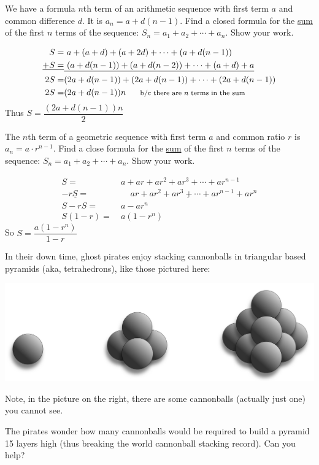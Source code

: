 \documentclass[10pt]{exam}
\begin{document}
\begin{questions}
\question[4] We have a formula $n$th term of an arithmetic sequence with first term $a$ and common difference $d$.  It is $a_n = a+d(n-1)$.  Find a closed formula for the \underline{sum} of the first $n$ terms of the sequence: $S_n = a_1 + a_2 + \cdots + a_n$.  Show your work.

\begin{solution}
  \begin{align*}
    S = &~ a + (a+d) + (a+2d) + \cdots + (a+d(n-1))\\
    \underline{+ S    = }& \underline{~(a+d(n-1)) + (a+d(n-2)) + \cdots + (a+d) + a}\\
    2S  = &(2a + d(n-1)) + (2a + d(n-1)) + \cdots + (2a + d(n-1))\\
    2S  = &(2a + d(n-1))n \mbox{~~~~ {\footnotesize b/c there are $n$ terms in the sum}}
  \end{align*}
Thus $S = \dfrac{(2a + d(n-1))n}{2}$
\end{solution}


\question[4] The $n$th term of a geometric sequence with first term $a$ and common ratio $r$ is $a_n = a\cdot r^{n-1}$.  Find a close formula for the \underline{sum} of the first $n$ terms of the sequence: $S_n = a_1 + a_2 + \cdots + a_n$.  Show your work.

\begin{solution}
  \begin{align*}
    S = &~ a + ar + ar^2 + ar^3 + \cdots + ar^{n-1} \\
    \underline{- rS = }& \underline{~~~~~~ ar + ar^2 + ar^3 + \cdots + ar^{n-1} + ar^n}\\
    S - rS = & ~ a - ar^n\\
    S(1-r) = & ~ a(1 - r^n)
  \end{align*}
So $S = \dfrac{a(1-r^n)}{1-r}$
\end{solution}


\question[6] In their down time, ghost pirates enjoy stacking cannonballs in triangular based pyramids (aka, tetrahedrons), like those pictured here:

\centerline{\includegraphics[height=.3in]{cannonballs.png}}

Note, in the picture on the right, there are some cannonballs (actually just one) you cannot see.  

The pirates wonder how many cannonballs would be required to build a pyramid 15 layers high (thus breaking the world cannonball stacking record).  Can you help?


\end{questions}
\end{document}
